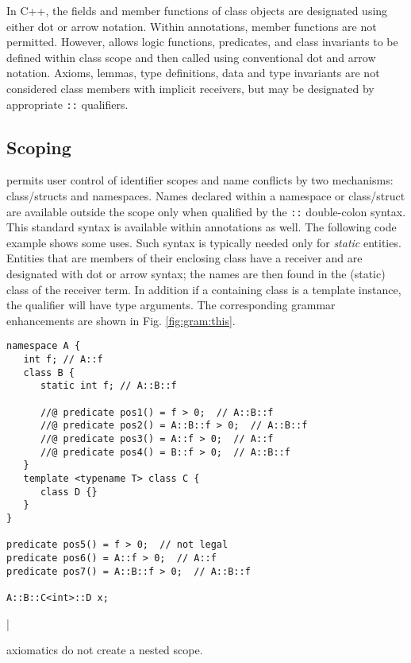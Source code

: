 In C++, the fields and member functions of class objects are designated using 
either dot or arrow notation. Within \NAME annotations, \lang member functions are not
permitted. However, \NAME allows logic functions, predicates, and class invariants to be defined
within class scope and then called using conventional \lang dot and arrow notation.
Axioms, lemmas, type definitions, data and type invariants are not considered class members with implicit receivers,
but may be designated by appropriate \lstinline|::| qualifiers.

\subsection{Scoping}

\lang permits user control of identifier scopes and name conflicts by two mechanisms: class/structs and namespaces. 
Names declared within a namespace or class/struct are available outside the scope only when qualified by the
\lstinline|::| double-colon syntax. This standard \lang syntax is available within \NAME annotations as well.
The following code example shows some uses. Such syntax is typically needed only for \textit{static} entities.
Entities that are members of their enclosing class have a receiver and are designated with dot or arrow syntax;
the names are then found in the (static) class of the receiver term. In addition if a containing class is a template
instance, the qualifier will have type arguments. The corresponding grammar enhancements are shown in Fig. \ref{fig:gram:this}.
\begin{lstlisting}
namespace A {
   int f; // A::f
   class B {
      static int f; // A::B::f
      
      //@ predicate pos1() = f > 0;  // A::B::f
      //@ predicate pos2() = A::B::f > 0;  // A::B::f
      //@ predicate pos3() = A::f > 0;  // A::f
      //@ predicate pos4() = B::f > 0;  // A::B::f   
   }
   template <typename T> class C {
      class D {}
   }
}

predicate pos5() = f > 0;  // not legal
predicate pos6() = A::f > 0;  // A::f
predicate pos7() = A::B::f > 0;  // A::B::f

A::B::C<int>::D x;
\end{lstlisting}|

\NAME axiomatics do not create a nested scope.



